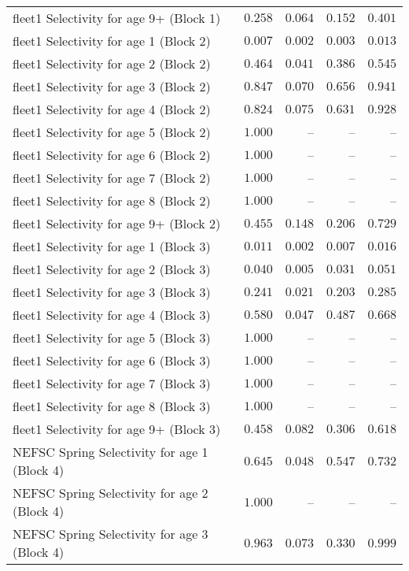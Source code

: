 \documentclass[
]{article}
\begin{document}
\begin{landscape}
\begin{longtable}[t]{lrrrr}
fleet1 Selectivity for age 9+ (Block 1) & $0.258$ & $0.064$ & $0.152$ & $0.401$\\
\addlinespace
fleet1 Selectivity for age 1 (Block 2) & $0.007$ & $0.002$ & $0.003$ & $0.013$\\
fleet1 Selectivity for age 2 (Block 2) & $0.464$ & $0.041$ & $0.386$ & $0.545$\\
fleet1 Selectivity for age 3 (Block 2) & $0.847$ & $0.070$ & $0.656$ & $0.941$\\
fleet1 Selectivity for age 4 (Block 2) & $0.824$ & $0.075$ & $0.631$ & $0.928$\\
fleet1 Selectivity for age 5 (Block 2) & $1.000$ & -- & -- & --\\
\addlinespace
fleet1 Selectivity for age 6 (Block 2) & $1.000$ & -- & -- & --\\
fleet1 Selectivity for age 7 (Block 2) & $1.000$ & -- & -- & --\\
fleet1 Selectivity for age 8 (Block 2) & $1.000$ & -- & -- & --\\
fleet1 Selectivity for age 9+ (Block 2) & $0.455$ & $0.148$ & $0.206$ & $0.729$\\
fleet1 Selectivity for age 1 (Block 3) & $0.011$ & $0.002$ & $0.007$ & $0.016$\\
\addlinespace
fleet1 Selectivity for age 2 (Block 3) & $0.040$ & $0.005$ & $0.031$ & $0.051$\\
fleet1 Selectivity for age 3 (Block 3) & $0.241$ & $0.021$ & $0.203$ & $0.285$\\
fleet1 Selectivity for age 4 (Block 3) & $0.580$ & $0.047$ & $0.487$ & $0.668$\\
fleet1 Selectivity for age 5 (Block 3) & $1.000$ & -- & -- & --\\
fleet1 Selectivity for age 6 (Block 3) & $1.000$ & -- & -- & --\\
\addlinespace
fleet1 Selectivity for age 7 (Block 3) & $1.000$ & -- & -- & --\\
fleet1 Selectivity for age 8 (Block 3) & $1.000$ & -- & -- & --\\
fleet1 Selectivity for age 9+ (Block 3) & $0.458$ & $0.082$ & $0.306$ & $0.618$\\
NEFSC Spring Selectivity for age 1 (Block 4) & $0.645$ & $0.048$ & $0.547$ & $0.732$\\
NEFSC Spring Selectivity for age 2 (Block 4) & $1.000$ & -- & -- & --\\
\addlinespace
NEFSC Spring Selectivity for age 3 (Block 4) & $0.963$ & $0.073$ & $0.330$ & $0.999$\\

\end{longtable}
\end{landscape}
\end{document}
